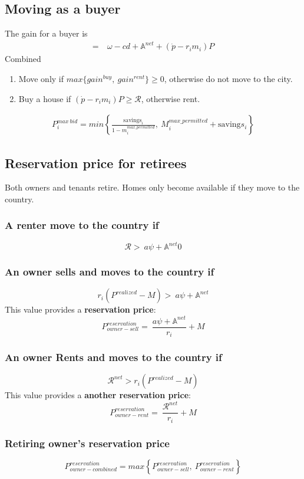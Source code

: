 {\subsection{Moving as a buyer}
The gain for a buyer is 
\begin{align}
=&\ \omega-cd+\mathbb{A}^{net}+(\dot p-r_im_i)P   \nonumber
\end{align}
Combined
\begin{enumerate}
    \item Move only if $max\{gain^{buy},\ gain^{rent}\} \ge 0$, otherwise do not move to the city.
    
    \item Buy a house if $(\dot p-r_im_i)P\ge  \mathcal{R}$, otherwise rent.
\end{enumerate}

\begin{align}
P_i^{max\ bid}= min \left\{\frac{\mathrm{savings}_i}{1-m_i^{max\_permitted}},\  M_i^{max\_permitted} + \mathrm{saving}s_i  \right\}   \nonumber  
\end{align}


\subsection{Reservation price for retirees}
Both owners and tenants retire. Homes only become available if they move to the country. 
\subsubsection{A renter move to the country if} 
\[\mathcal{R} > \ a\psi+ \mathbb{A}^{net}0\]
\subsubsection{An owner sells and moves to the country if}
\[r_i(P^{realized}-M) >\ a\psi+ \mathbb{A}^{net}\]
This value provides a \textbf{reservation price}: 
\[P_{owner-sell}^{reservation} =\ \frac{a\psi+ \mathbb{A}^{net}}{r_i}+M \]

\subsubsection{An owner Rents and moves to the country if} 
\[\mathcal{R}^{net}>r_i(P^{realized}-M)\]
This value provides a \textbf{another reservation price}: 
\[P_{owner-rent}^{reservation} =\ \frac{\mathcal{R}^{net}}{r_i}+M \]

\subsubsection{Retiring owner's reservation price}
\[P_{owner-combined}^{reservation}= max\left\{ P_{owner-sell}^{reservation} ,\ P_{owner-rent}^{reservation}\right\}\]

}


